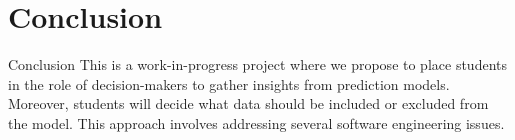 \section{Conclusion}

\begin{frame}{Conclusion}
    This is a work-in-progress project where we propose to place students in the role of 
    decision-makers to gather insights from prediction models. 
    Moreover, students will decide what data should be included or excluded from the model. 
    This approach involves addressing several software engineering issues.
    \pause

\end{frame}

